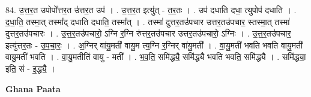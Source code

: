 \documentclass[17pt]{extarticle}
\begin{document}
84. उ॒त्त॒र॒त उपोपो᳚त्तर॒त उ॑त्तर॒त उप॑ । . उ॒त्त॒र॒त इत्यु॑त् - त॒र॒तः । . उप॑ दधाति दधा॒ त्युपोप॑ दधाति । . द॒धा॒ति॒ तस्मा॒त् तस्मा᳚द् दधाति दधाति॒ तस्मा᳚त् । . तस्मा॑ दुत्तर॒त‌उ॑पचार उत्तर॒त‌उ॑पचार॒ स्तस्मा॒त् तस्मा॑ दुत्तर॒त‌उ॑पचारः । . उ॒त्त॒र॒त‌उ॑पचारो॒ ऽग्नि र॒ग्नि रु॑त्तर॒त‌उ॑पचार उत्तर॒त‌उ॑पचारो॒ ऽग्निः । . उ॒त्त॒र॒त‌उ॑पचार॒ इत्यु॑त्तर॒तः - उ॒प॒चा॒रः॒ । . अ॒ग्निर् वा॑यु॒मती॑ वायु॒म त्य॒ग्नि र॒ग्निर् वा॑यु॒मती᳚ । . वा॒यु॒मती॑ भवति भवति वायु॒मती॑ वायु॒मती॑ भवति । . वा॒यु॒मतीति॑ वायु - मती᳚ । . भ॒व॒ति॒ समि॑द्ध्यै॒ समि॑द्ध्यै भवति भवति॒ समि॑द्ध्यै । . समि॑द्ध्या॒ इति॒ सं - इ॒द्ध्यै॒ । \newline

\textbf{Ghana Paata } \newline
\end{document}
